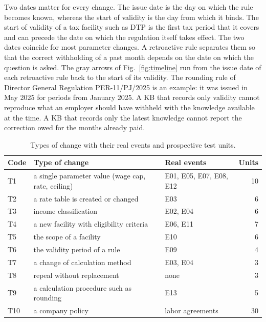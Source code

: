 Two dates matter for every change. The issue date is the day on which the rule becomes known, whereas the start of validity is the day from which it binds. The start of validity of a tax facility such as DTP is the first tax period that it covers and can precede the date on which the regulation itself takes effect. The two dates coincide for most parameter changes. A retroactive rule separates them so that the correct withholding of a past month depends on the date on which the question is asked. The gray arrows of Fig.~\ref{fig:timeline} run from the issue date of each retroactive rule back to the start of its validity. The rounding rule of Director General Regulation PER-11/PJ/2025 is an example: it was issued in May 2025 for periods from January 2025. A KB that records only validity cannot reproduce what an employer should have withheld with the knowledge available at the time. A KB that records only the latest knowledge cannot report the correction owed for the months already paid.

\begin{table}[!t]
\caption{Types of change with their real events and prospective test units.}
\label{tab:types}
\centering\footnotesize
\setlength{\tabcolsep}{3pt}
\begin{tabularx}{\columnwidth}{@{}lLlr@{}}
\toprule
Code & Type of change & Real events & Units \\
\midrule
T1 & a single parameter value (wage cap, rate, ceiling) & E01, E05, E07, E08, E12 & 10 \\
T2 & a rate table is created or changed & E03 & 6 \\
T3 & income classification & E02, E04 & 6 \\
T4 & a new facility with eligibility criteria & E06, E11 & 7 \\
T5 & the scope of a facility & E10 & 6 \\
T6 & the validity period of a rule & E09 & 4 \\
T7 & a change of calculation method & E03, E04 & 3 \\
T8 & repeal without replacement & none & 3 \\
T9 & a calculation procedure such as rounding & E13 & 5 \\
T10 & a company policy & labor agreements & 30 \\
\bottomrule
\end{tabularx}
\end{table}

